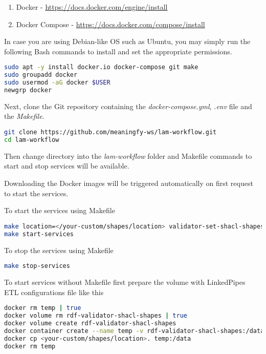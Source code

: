 \begin{enumerate}
	\item Docker - \url{https://docs.docker.com/engine/install}
	\item Docker Compose - \url{https://docs.docker.com/compose/install}
\end{enumerate}

In case you are using Debian-like OS such as Ubuntu, you may simply run the following Bash commands to install and set the appropriate permissions.

\begin{lstlisting}[language=bash,]
sudo apt -y install docker.io docker-compose git make
sudo groupadd docker
sudo usermod -aG docker $USER
newgrp docker
	\end{lstlisting}

Next, clone the Git repository containing the \textit{docker-compose.yml}, \textit{.env} file and the \textit{Makefile}.

\begin{lstlisting}[language=bash,]
git clone https://github.com/meaningfy-ws/lam-workflow.git
cd lam-workflow
\end{lstlisting}

Then change directory into the \textit{lam-workflow} folder and Makefile commands to start and stop services will be available.

Downloading the Docker images will be triggered automatically on first request to start the services.

To start the services using Makefile

\begin{lstlisting}[language=bash,]
make location=</your-custom/shapes/location> validator-set-shacl-shapes
make start-services
\end{lstlisting}

To stop the services using Makefile

\begin{lstlisting}[language=bash,]
make stop-services
\end{lstlisting}

To start services without Makefile first prepare the volume with LinkedPipes ETL configurations file like this

\begin{lstlisting}[language=bash,]
docker rm temp | true
docker volume rm rdf-validator-shacl-shapes | true
docker volume create rdf-validator-shacl-shapes
docker container create --name temp -v rdf-validator-shacl-shapes:/data busybox
docker cp <your-custom/shapes/location>. temp:/data
docker rm temp
\end{lstlisting}

